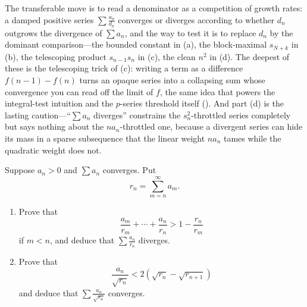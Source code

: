 \documentclass[main.tex]{subfiles}
\begin{document}
\begin{Reflection}
The transferable move is to read a denominator as a competition of growth rates: a damped positive
series $\sum\frac{a_n}{d_n}$ converges or diverges according to whether $d_n$ outgrows the divergence
of $\sum a_n$, and the way to test it is to replace $d_n$ by the dominant comparison---the bounded
constant in (a), the block-maximal $s_{N+k}$ in (b), the telescoping product $s_{n-1}s_n$ in (c), the
clean $n^2$ in (d). The deepest of these is the telescoping trick of (c): writing a term as a
difference $f(n-1)-f(n)$ turns an opaque series into a collapsing sum whose convergence you can read off
the limit of $f$, the same idea that powers the integral-test intuition and the $p$-series threshold
itself (). And part (d) is the lasting caution---``$\sum a_n$ diverges'' constrains the
$s_n^2$-throttled series completely but says nothing about the $n a_n$-throttled one, because a divergent
series can hide its mass in a sparse subsequence that the linear weight $n a_n$ tames while the
quadratic weight does not.
\end{Reflection}

Suppose $a_{n} > 0$ and $\sum a_{n}$ converges. Put
\[
r_{n} = \sum_{m=n}^{\infty} a_{m}.
\]
\begin{enumerate}
  \item Prove that
  \[
  \frac{a_{m}}{r_{m}} + \cdots + \frac{a_{n}}{r_{n}} > 1 - \frac{r_{n}}{r_{m}}
  \]
  if $m < n$, and deduce that $\displaystyle\sum \frac{a_{n}}{r_{n}}$ diverges.
  \item Prove that
  \[
  \frac{a_{n}}{\sqrt{r_{n}}} < 2\left(\sqrt{r_{n}} - \sqrt{r_{n+1}}\right)
  \]
  and deduce that $\displaystyle\sum \frac{a_{n}}{\sqrt{r_{n}}}$ converges.
\end{enumerate}
\end{document}
